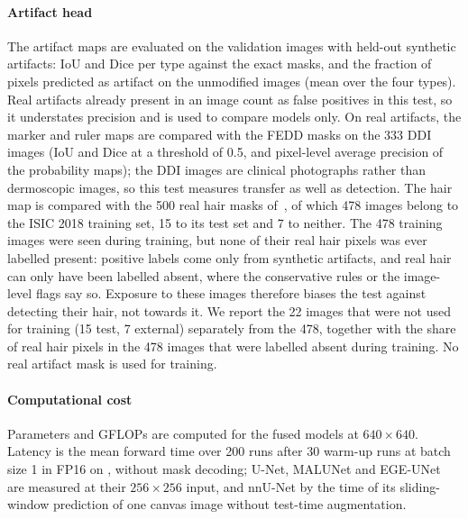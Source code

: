 \paragraph{Artifact head}
The artifact maps are evaluated on the validation images with held-out synthetic artifacts: IoU and Dice per type against the exact masks, and the fraction of pixels predicted as artifact on the unmodified images (mean over the four types). Real artifacts already present in an image count as false positives in this test, so it understates precision and is used to compare models only. On real artifacts, the marker and ruler maps are compared with the FEDD masks on the 333 DDI images (IoU and Dice at a threshold of 0.5, and pixel-level average precision of the probability maps); the DDI images are clinical photographs rather than dermoscopic images, so this test measures transfer as well as detection. The hair map is compared with the 500 real hair masks of~\cite{hossain2023hairmask}, of which 478 images belong to the ISIC 2018 training set, 15 to its test set and 7 to neither. The 478 training images were seen during training, but none of their real hair pixels was ever labelled present: positive labels come only from synthetic artifacts, and real hair can only have been labelled absent, where the conservative rules or the image-level flags say so. Exposure to these images therefore biases the test against detecting their hair, not towards it. We report the 22 images that were not used for training (15 test, 7 external) separately from the 478, together with the share of real hair pixels in the 478 images that were labelled absent during training. No real artifact mask is used for training.

\paragraph{Computational cost}
Parameters and GFLOPs are computed for the fused models at $640\times640$. Latency is the mean forward time over 200 runs after 30 warm-up runs at batch size 1 in FP16 on , without mask decoding; U-Net, MALUNet and EGE-UNet are measured at their $256\times256$ input, and nnU-Net by the time of its sliding-window prediction of one canvas image without test-time augmentation.

